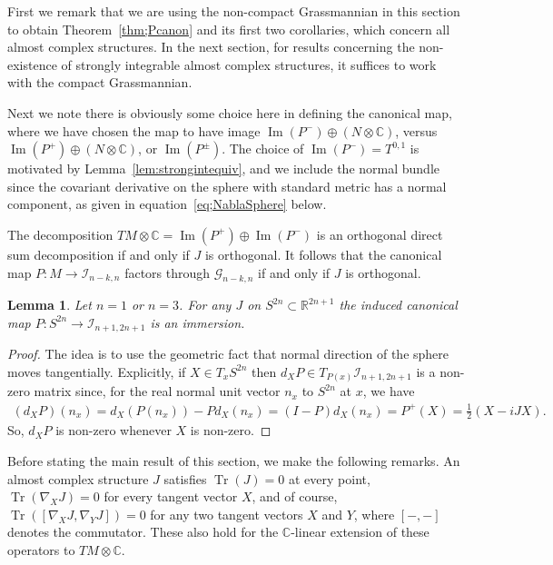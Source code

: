 \documentclass[pdftex]{sigma}
\DeclareMathOperator{\Tr}{Tr}
\newtheorem{lem}[thm]{Lemma}
\numberwithin{equation}{section}
\newcommand{\R}{\mathbb{R}}
\newcommand{\CC}{\mathbb{C}}
\newcommand{\cG}{{\mathcal G}}
\newcommand{\cI}{{\mathcal I}}
\begin{document}
First we remark that we are using the non-compact Grassmannian in this section to obtain Theorem~\ref{thm;Pcanon} and its first two corollaries, which concern all almost complex structures. In the next section, for results concerning the non-existence of strongly integrable almost complex structures, it suffices to work with the compact Grassmannian.

Next we note there is obviously some choice here in defining the canonical map, where we have chosen the map to have image $\operatorname{Im}(P^-) \oplus ( N \otimes \CC )$, versus $\operatorname{Im}(P^+) \oplus ( N \otimes \CC )$, or $\operatorname{Im}(P^\pm)$. The choice of $\operatorname{Im}(P^-)= T^{0,1}$ is motivated by Lemma~\ref{lem:strongintequiv}, and we include the normal bundle since the covariant derivative on the sphere with standard metric has a normal component, as given in equation~\eqref{eq;NablaSphere} below.

\begin{rmk}The decomposition $TM \otimes \CC = \operatorname{Im}(P^+) \oplus \operatorname{Im}(P^-)$ is an orthogonal direct sum decomposition if and only if $J$ is orthogonal. It follows that the canonical map $P\colon M \to \cI_{n-k,n}$ factors through $\cG_{n-k,n}$ if and only if $J$ is orthogonal.
\end{rmk}

\begin{lem} \label{lem;Pcanonemb}
Let $n=1$ or $n=3$. For any $J$ on $S^{2n} \subset \R^{2n+1}$ the induced canonical map $P\colon S^{2n} \to \cI_{n+1,2n+1}$ is an immersion.
\end{lem}

\begin{proof} The idea is to use the geometric fact that normal direction of the sphere moves tangentially. Explicitly, if $X \in T_xS^{2n}$ then $d_X P \in T_{P(x)} \cI_{n+1,2n+1}$ is a non-zero matrix since, for the real normal unit vector $n_x$ to $S^{2n}$ at $x$, we have
\begin{gather*}
(d_XP)(n_x) = d_X(P(n_x)) - P d_X(n_x) = (I-P) d_X(n_x) = P^+(X) = \frac 1 2 (X - i J X).
\end{gather*}
So, $d_X P$ is non-zero whenever $X$ is non-zero.
\end{proof}

Before stating the main result of this section, we make the following remarks. An almost complex structure $J$ satisfies $\Tr(J)=0$ at every point, $\Tr(\nabla_X J) =0$ for every tangent vector $X$, and of course, $\Tr ([\nabla_X J, \nabla_Y J] )=0$ for any two tangent vectors $X$ and $Y$, where $[-,-]$ denotes the commutator. These also hold for the $\CC$-linear extension of these operators to $TM \otimes \CC$.
\end{document}
